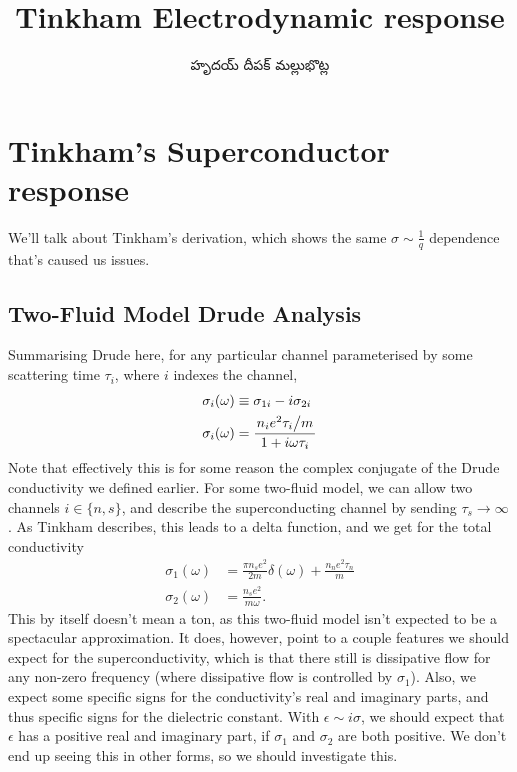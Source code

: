 \documentclass[../main.tex]{subfiles}
\title{Tinkham Electrodynamic response}
\author{\begin{telugu}హృదయ్ దీపక్ మల్లుభొట్ల\end{telugu}}
\date{}
\begin{document}
	\onlyinsubfile{\maketitle}
	\section{Tinkham's Superconductor response} \label{sec:TinkhamResponse}

	We'll talk about Tinkham's derivation\supercite{Tinkham}, which shows the same $\sigma\sim\frac{1}{q}$ dependence that's caused us issues.

	\subsection{Two-Fluid Model Drude Analysis} \label{subsec:twofluid}

	Summarising Drude here, for any particular channel parameterised by some scattering time $\tau_i$, where $i$ indexes the channel,
	\begin{align}
		\sigma_i(\omega) &\equiv \sigma_{1i} - i \sigma_{2i} \\
		\sigma_i(\omega) &= \frac{\flatfrac{n_i e^2 \tau_i}{m}}{1 + i \omega \tau_i} \label{eq:tinkhamdrude}
	\end{align}
	Note that effectively this is for some reason the complex conjugate of the Drude conductivity we defined earlier.
	For some two-fluid model, we can allow two channels $i \in \{n, s\}$, and describe the superconducting channel by sending $\tau_s \rightarrow \infty$.
	As Tinkham describes, this leads to a delta function, and we get for the total conductivity
	\begin{align}
		\sigma_1(\omega) &= \frac{\pi n_s e^2}{2m} \delta(\omega) + \frac{n_n e^2 \tau_n}{m} \\
		\sigma_2(\omega) &= \frac{n_s e^2}{m \omega}.
	\end{align}
	This by itself doesn't mean a ton, as this two-fluid model isn't expected to be a spectacular approximation.
	It does, however, point to a couple features we should expect for the superconductivity, which is that there still is dissipative flow for any non-zero frequency (where dissipative flow is controlled by $\sigma_1$).
	Also, we expect some specific signs for the conductivity's real and imaginary parts, and thus specific signs for the dielectric constant.
	With $\epsilon \sim i \sigma$, we should expect that $\epsilon$ has a positive real and imaginary part, if $\sigma_1$ and $\sigma_2$ are both positive.
	We don't end up seeing this in other forms, so we should investigate this.
\end{document}
